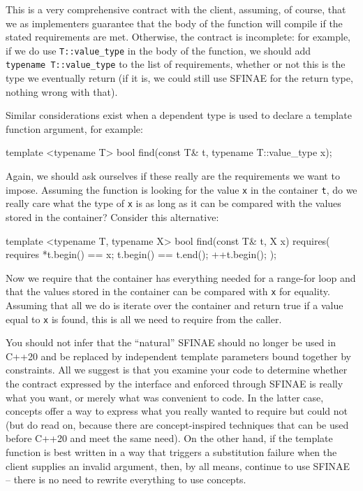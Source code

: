 This is a very comprehensive contract with the client, assuming, of course, that we as implementers guarantee that the body of the function will compile if the stated requirements are met. Otherwise, the contract is incomplete: for example, if we do use \texttt{T::value\_type} in the body of the function, we should add \texttt{typename\ T::value\_type} to the list of requirements, whether or not this is the type we eventually return (if it is, we could still use SFINAE for the return type, nothing wrong with that).

Similar considerations exist when a dependent type is used to declare a template function argument, for example:

\begin{code}
template <typename T>
bool find(const T& t, typename T::value_type x);
\end{code}

Again, we should ask ourselves if these really are the requirements we want to impose. Assuming the function is looking for the value \texttt{x} in the container \texttt{t}, do we really care what the type of \texttt{x} is as long as it can be compared with the values stored in the container? Consider this alternative:

\begin{code}
template <typename T, typename X>
bool find(const T& t, X x)
requires( requires {
  *t.begin() == x;
  t.begin() == t.end();
  ++t.begin();
} );
\end{code}

Now we require that the container has everything needed for a range-for loop and that the values stored in the container can be compared with \texttt{x} for equality. Assuming that all we do is iterate over the container and return true if a value equal to \texttt{x} is found, this is all we need to require from the caller.

You should not infer that the ``natural'' SFINAE should no longer be used in C++20 and be replaced by independent template parameters bound together by constraints. All we suggest is that you examine your code to determine whether the contract expressed by the interface and enforced through SFINAE is really what you want, or merely what was convenient to code. In the latter case, concepts offer a way to express what you really wanted to require but could not (but do read on, because there are concept-inspired techniques that can be used before C++20 and meet the same need). On the other hand, if the template function is best written in a way that triggers a substitution failure when the client supplies an invalid argument, then, by all means, continue to use SFINAE -- there is no need to rewrite everything to use concepts.

